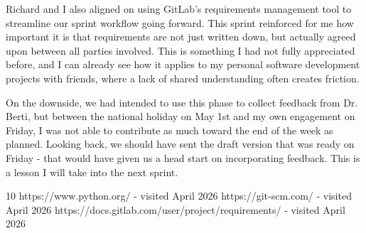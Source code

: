 \documentclass[12pt,a4paper]{article}
\begin{document}
Richard and I also aligned on using GitLab's requirements management tool to streamline our sprint workflow going forward. This sprint reinforced for me how important it is that requirements are not just written down, but actually agreed upon between all parties involved. This is something I had not fully appreciated before, and I can already see how it applies to my personal software development projects with friends, where a lack of shared understanding often creates friction.

On the downside, we had intended to use this phase to collect feedback from Dr. Berti, but between the national holiday on May 1st and my own engagement on Friday, I was not able to contribute as much toward the end of the week as planned. Looking back, we should have sent the draft version that was ready on Friday - that would have given us a head start on incorporating feedback. This is a lesson I will take into the next sprint.

\begin{thebibliography}{10}
https://www.python.org/ - visited April 2026
https://git-scm.com/ - visited April 2026
https://docs.gitlab.com/user/project/requirements/ - visited April 2026
\end{thebibliography}
\end{document}
